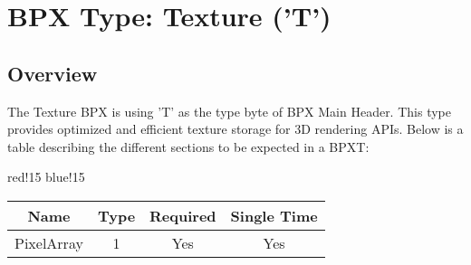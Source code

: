 \section{BPX Type: Texture ('T')}

\subsection{Overview}
The Texture BPX is using 'T' as the type byte of BPX Main Header. This type provides optimized and efficient texture storage for 3D rendering APIs.
\newline
Below is a table describing the different sections to be expected in a BPXT:
\begin{center}
    {
        {red!15}
        {blue!15}
        \begin{tabular}{|c|c|c|c|}
            \hline
            \textbf{Name} & \textbf{Type} & \textbf{Required} & \textbf{Single Time} \\

            \hline\hline
            PixelArray & 1 & Yes & Yes \\
            \hline
        \end{tabular}
    }
\end{center}

